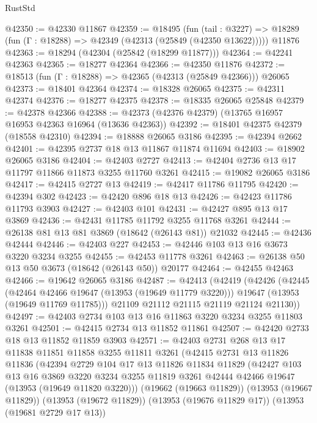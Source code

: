 \begin{lexlean}{RustStd}
\begin{coremodule}
@42350 := @42330 @11867
@42359 := @18495
    (fun (tail : @3227) => @18289 (fun (Γ : @18288) => @42349 (@42313 (@25849 (@42350 @13622)))))
    @11876
@42363 := @18294 (@42304 (@25842 (@18299 @11877)))
@42364 := @42241 @42363
@42365 := @18277 @42364
@42366 := @42350 @11876
@42372 := @18513 (fun (Γ : @18288) => @42365 (@42313 (@25849 @42366))) @26065
@42373 := @18401 @42364
@42374 := @18328 @26065
@42375 := @42311 @42374
@42376 := @18277 @42375
@42378 := @18335 @26065 @25848
@42379 := @42378 @42366
@42388 := @42373 (@42376 @42379) (@13765 @16957 @16953 @42363 @16964 (@13636 @42363))
@42392 := @18401 @42375 @42379 (@18558 @42310)
@42394 := @18888 @26065 @3186
@42395 := @42394 @2662
@42401 := @42395 @2737 @18 @13 @11867 @11874 @11694
@42403 := @18902 @26065 @3186
@42404 := @42403 @2727
@42413 := @42404 @2736 @13 @17 @11797 @11866 @11873 @3255 @11760 @3261
@42415 := @19082 @26065 @3186
@42417 := @42415 @2727 @13
@42419 := @42417 @11786 @11795
@42420 := @42394 @302
@42423 := @42420 @896 @18 @13
@42426 := @42423 @11786 @11793 @3903
@42427 := @42403 @101
@42431 := @42427 @895 @13 @17 @3869
@42436 := @42431 @11785 @11792 @3255 @11768 @3261
@42444 := @26138 @81 @13 @81 @3869 (@18642 (@26143 @81)) @21032
@42445 := @42436 @42444
@42446 := @42403 @227
@42453 := @42446 @103 @13 @16 @3673 @3220 @3234 @3255
@42455 := @42453 @11778 @3261
@42463 := @26138 @50 @13 @50 @3673 (@18642 (@26143 @50)) @20177
@42464 := @42455 @42463
@42466 := @19642 @26065 @3186
@42487 := @42413
    (@42419
      (@42426
        (@42445
          (@42464 @42466 @19647 (@13953 (@19649 @11779 @3220)))
          @19647
          (@13953 (@19649 @11769 @11785)))
        @21109
        @21112
        @21115
        @21119
        @21124
        @21130))
@42497 := @42403 @2734 @103 @13 @16 @11863 @3220 @3234 @3255 @11803 @3261
@42501 := @42415 @2734 @13 @11852 @11861
@42507 := @42420 @2733 @18 @13 @11852 @11859 @3903
@42571 := @42403
    @2731
    @268
    @13
    @17
    @11838
    @11851
    @11858
    @3255
    @11811
    @3261
    (@42415
      @2731
      @13
      @11826
      @11836
      (@42394
        @2729
        @104
        @17
        @13
        @11826
        @11834
        @11829
        (@42427
          @103
          @13
          @16
          @3869
          @3220
          @3234
          @3255
          @11819
          @3261
          @42444
          @42466
          @19647
          (@13953 (@19649 @11820 @3220)))
        (@19662 (@19663 @11829))
        (@13953 (@19667 @11829))
        (@13953 (@19672 @11829))
        (@13953 (@19676 @11829 @17))
        (@13953 (@19681 @2729 @17 @13))

\end{coremodule}
\end{lexlean}
